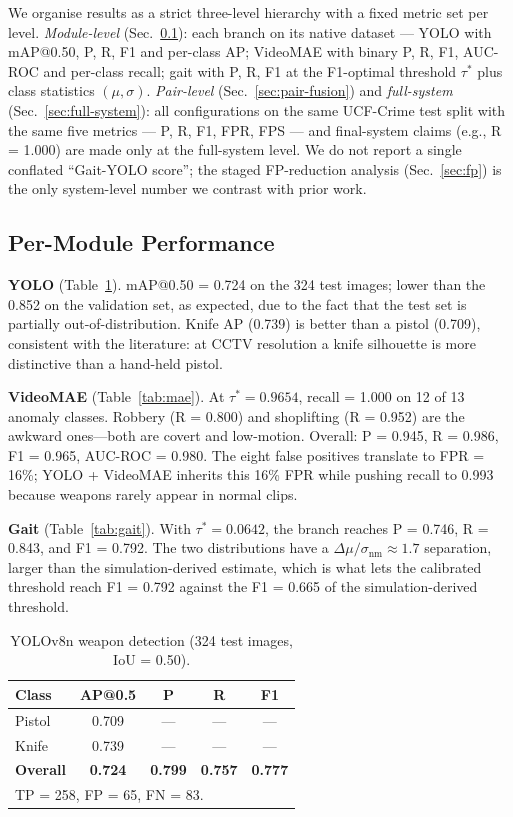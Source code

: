 \documentclass[runningheads]{llncs}
\begin{document}
We organise results as a strict three-level hierarchy with a fixed metric set per level. \textit{Module-level} (Sec.~\ref{sec:per-module}): each branch on its native dataset --- YOLO with mAP@0.50, P, R, F1 and per-class AP; VideoMAE with binary P, R, F1, AUC-ROC and per-class recall; gait with P, R, F1 at the F1-optimal threshold $\tau^*$ plus class statistics $(\mu,\sigma)$. \textit{Pair-level} (Sec.~\ref{sec:pair-fusion}) and \textit{full-system} (Sec.~\ref{sec:full-system}): all configurations on the same UCF-Crime test split with the same five metrics --- P, R, F1, FPR, FPS --- and final-system claims (e.g., R = 1.000) are made only at the full-system level. We do not report a single conflated ``Gait-YOLO score''; the staged FP-reduction analysis (Sec.~\ref{sec:fp}) is the only system-level number we contrast with prior work.

\subsection{Per-Module Performance}\label{sec:per-module}

\textbf{YOLO} (Table~\ref{tab:yolo}). mAP@0.50 = 0.724 on the 324 test images; lower than the 0.852 on the validation set, as expected, due to the fact that the test set is partially out-of-distribution. Knife AP (0.739) is better than a pistol (0.709), consistent with the literature: at CCTV resolution a knife silhouette is more distinctive than a hand-held pistol.

\textbf{VideoMAE} (Table~\ref{tab:mae}). At $\tau^* = 0.9654$, recall = 1.000 on 12 of 13 anomaly classes. Robbery (R = 0.800) and shoplifting (R = 0.952) are the awkward ones---both are covert and low-motion. Overall: P = 0.945, R = 0.986, F1 = 0.965, AUC-ROC = 0.980. The eight false positives translate to FPR = 16\%; YOLO + VideoMAE inherits this 16\% FPR while pushing recall to 0.993 because weapons rarely appear in normal clips.

\textbf{Gait} (Table~\ref{tab:gait}). With $\tau^* = 0.0642$, the branch reaches P = 0.746, R = 0.843, and F1 = 0.792. The two distributions have a $\Delta\mu / \sigma_\text{nm} \approx 1.7$ separation, larger than the simulation-derived estimate, which is what lets the calibrated threshold reach F1 = 0.792 against the F1 = 0.665 of the simulation-derived threshold.

\begin{table}[!htbp]
\caption{YOLOv8n weapon detection (324 test images, IoU = 0.50).}
\label{tab:yolo}
\centering
\begin{tabular}{lcccc}
\toprule
\textbf{Class} & \textbf{AP@0.5} & \textbf{P} & \textbf{R} & \textbf{F1}\\
\midrule
Pistol & 0.709 & --- & --- & ---\\
Knife  & 0.739 & --- & --- & ---\\
\midrule
\textbf{Overall} & \textbf{0.724} & \textbf{0.799} & \textbf{0.757} & \textbf{0.777}\\
\bottomrule
\multicolumn{5}{l}{\footnotesize TP = 258, FP = 65, FN = 83.}
\end{tabular}
\end{table}
\end{document}
